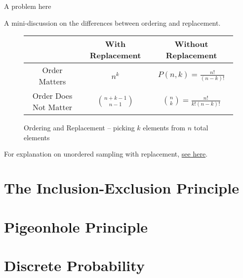 \documentclass[main.tex]{subfiles}
\begin{document}
\begin{example}
	A problem here
\end{example}

A mini-discussion on the differences between ordering and replacement.

\begin{figure}[H]
	\centering
	\begin{tabular}{ccc}
		& With Replacement & Without Replacement \\
		\midrule
		Order Matters & \(n^k\) & \(P(n,k) = \frac{n!}{(n-k)!}\) \\
		\midrule
		Order Does Not Matter & \(\binom{n+k-1}{n-1}\) & \(\binom{n}{k} = \frac{n!}{k!(n-k)!}\) \\
	\end{tabular}
	\caption{Ordering and Replacement -- picking \(k\) elements from \(n\) total elements}
\end{figure}

\begin{rem}
	For explanation on unordered sampling with replacement, \href{https://www.probabilitycourse.com/chapter2/2_1_4_unordered_with_replacement.php}{see here}.
\end{rem}

\section{The Inclusion-Exclusion Principle}

\begin{thm}
	
\end{thm}



\section{Pigeonhole Principle}

\begin{thm}
	
\end{thm}

\begin{thm}
	
\end{thm}

\section{Discrete Probability}
\end{document}
